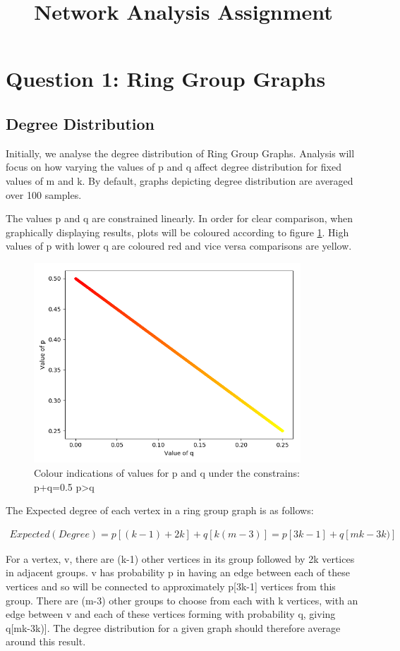 \documentclass[12pt,a4paper]{article}
\title{Network Analysis Assignment}
\date{}
\begin{document}
\maketitle
\section{Question 1: Ring Group Graphs}
\subsection{Degree Distribution}
Initially, we analyse the degree distribution of Ring Group Graphs. Analysis will  focus on how varying the values of p and q affect degree distribution for fixed values of m and k. By default, graphs depicting degree distribution are averaged over 100 samples.

The values p and q are constrained linearly. In order for clear comparison, when graphically displaying results, plots will be coloured according to figure \ref{legend}. High values of p with lower q are coloured red and vice versa comparisons are yellow.

 \begin{figure}[h]
	\centering
	\includegraphics[width=10cm]{Figures/1/Legend.png}
	\caption{Colour indications of values for p and q under the constrains: p+q=0.5 p>q}
	\label{legend}
\end{figure}

The Expected degree of each vertex in a ring group graph is as follows:

\begin{align*}
	Expected(Degree) =  p[(k-1) + 2k] + q[k(m-3)] = p[3k-1] + q[mk-3k)]
\end{align*} 

For a vertex, v, there are (k-1) other vertices in its group followed by 2k vertices in adjacent groups. v has probability p in having an edge between each of these vertices and so will be connected to approximately p[3k-1] vertices from this group. There are (m-3) other groups to choose from each with k vertices, with an edge  between v and each of these vertices forming with probability q, giving q[mk-3k)]. The degree distribution for a given graph should therefore average around this result.
\end{document}

